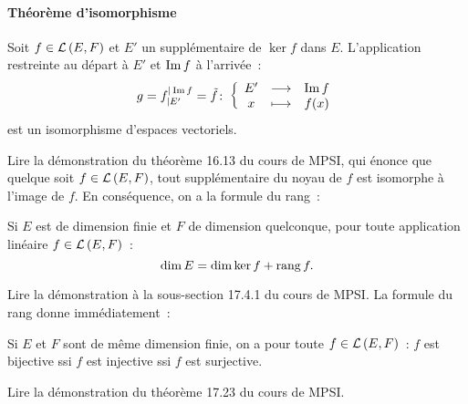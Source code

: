 \paragraph{Théorème d'isomorphisme}
\begin{theo}
	Soit $f \in \mathcal{L}\left(E,F\right)$ et $E'$ un supplémentaire de $\ker{f}$ dans $E$. L'application restreinte au départ à $E'$ et $\operatorname{Im}{f}$ à l'arrivée~:
	\begin{equation}
		g=f_{|E'}^{|\operatorname{Im}{f}} = \tilde{f}\colon \left\{\begin{array}{ccc} E' & \longrightarrow &\operatorname{Im}{f}\\ x & \longmapsto & f(x) \end{array} \right.
	\end{equation}
	est un isomorphisme d'espaces vectoriels.
\end{theo}
Lire la démonstration du théorème 16.13 du cours de MPSI, qui énonce que quelque soit $f \in \mathcal{L}\left(E,F\right)$, tout supplémentaire du noyau de $f$ est isomorphe à l'image de $f$.
En conséquence, on a la formule du rang~:
\begin{corth}
	Si $E$ est de dimension finie et $F$ de dimension quelconque, pour toute application linéaire $f \in \mathcal{L}\left(E,F\right)$~:
	\begin{equation}
		\operatorname{dim}{E} = \operatorname{dim}{\ker{f}} + \operatorname{rang}{f}.
	\end{equation}
\end{corth}
Lire la démonstration à la sous-section 17.4.1 du cours de MPSI. La formule du rang donne immédiatement~:
\begin{corth}
	Si $E$ et $F$ sont de même dimension finie, on a pour toute $f \in \mathcal{L}\left(E,F\right)$~: $f$ est bijective ssi $f$ est injective ssi $f$ est surjective.
\end{corth}
Lire la démonstration du théorème 17.23 du cours de MPSI.
